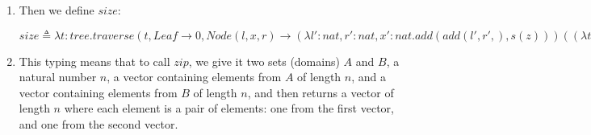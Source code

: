 \begin{enumerate}[label=(\alph*)]
          \[
            \frac{\Gamma \vdash l : tree \hspace{15pt} \Gamma \vdash x : nat \hspace{15pt} \Gamma \vdash r : tree}{\Gamma \vdash Node(l,x,r): tree}
          .\] 

          \[
            \frac{\Gamma \vdash t : tree \hspace{15pt} \Gamma \vdash e_l : T \hspace{15pt} \Gamma \vdash e_b : (tree \rightarrow T') \hspace{15pt} \Gamma \vdash e_c: T' \rightarrow T' \rightarrow int \rightarrow T}{\Gamma \vdash traverse(t, Leaf \rightarrow e_l, Node(l,x,r) \rightarrow e_c (e_b l) (e_b r) x)}
          .\] 

          \item
            Then we define $size$:

            $size \triangleq \lambda t: tree. traverse(t, Leaf \rightarrow 0, Node(l,x, r) \rightarrow (\lambda l':nat ,r':nat, x':nat. add(add(l',r',), s(z))) ((\lambda t':tree. size t') l) ((\lambda t' : tree. size t') r) x)$

            \item

              This typing means that to call $zip$, we give it two sets (domains) $A$ and $B$, a natural number $n$, a vector containing elements from $A$ of length $n$, and a vector containing elements from $B$ of length $n$, and then returns a vector of length $n$ where each element is a pair of elements: one from  the first vector, and one from the second vector.



        
    \end{enumerate}

